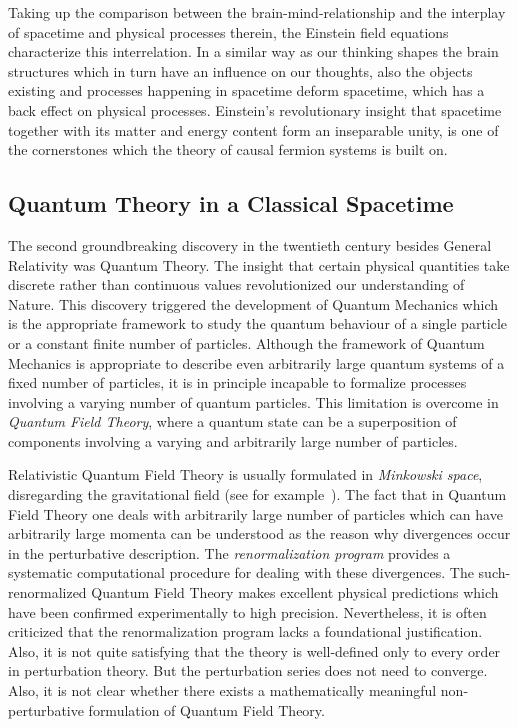 \documentclass[reqno,11pt]{amsart}
\numberwithin{equation}{section}
\newcommand{\1}{\mbox{\rm 1 \hspace{-1.05 em} 1}}
\begin{document}
Taking up the comparison between the brain-mind-relationship and the interplay of spacetime and physical processes therein, the Einstein field equations characterize this interrelation. 
In a similar way as our thinking
shapes the brain structures which in turn have an influence on our thoughts, also the objects existing and processes happening in spacetime deform spacetime, which has a back effect on physical processes. Einstein's revolutionary insight that spacetime together with its matter and energy content form an inseparable unity, is one of the cornerstones which the theory of causal fermion systems is built on.

\subsection{Quantum Theory in a Classical Spacetime}
The second groundbreaking discovery in the twentieth century besides General Relativity was Quantum Theory.
The insight that certain physical quantities take discrete rather than continuous values
revolutionized our understanding of Nature. This discovery triggered the development of Quantum Mechanics which is the appropriate framework to study the quantum behaviour of a single particle or a constant finite number of particles. Although the framework of Quantum Mechanics is appropriate to describe even arbitrarily large quantum
systems of a fixed number of particles, it is in principle incapable to formalize processes involving a varying number of quantum particles. This limitation is overcome in {\em{Quantum Field Theory}}, where a quantum state
can be a superposition of components involving a varying and arbitrarily large number of particles.

Relativistic Quantum Field Theory is usually formulated in {\em{Minkowski space}}, disregarding the
gravitational field (see for example~\cite{bjorken, bjorken2, peskin+schroeder}).
The fact that in Quantum Field Theory one deals with arbitrarily large number of particles which
can have arbitrarily large momenta can be understood as the reason why
divergences occur in the perturbative description.
The {\em{renormalization program}} provides a systematic
computational procedure for dealing with these divergences.
The such-renormalized Quantum Field Theory makes excellent physical predictions which have
been confirmed experimentally to high precision.
Nevertheless, it is often criticized that the renormalization program lacks a foundational justification.
Also, it is not quite satisfying that the theory is well-defined only to every order in perturbation theory.
But the perturbation series does not need to converge. Also, it is not clear whether
there exists a mathematically meaningful non-perturbative formulation of
Quantum Field Theory.
\end{document}
